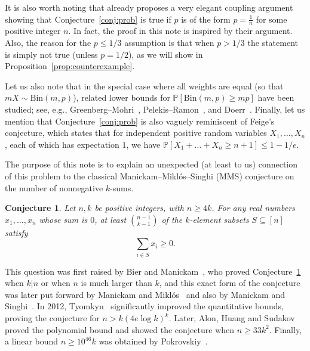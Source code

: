 \documentclass[11pt]{amsart}
\newtheorem{conjecture}[theorem]{\bf Conjecture}
\theoremstyle{definition}
\def\Pb{\mathbb{P}}
\begin{document}
It is also worth noting that \cite{AEFT13} already proposes a very elegant coupling argument showing that Conjecture~\ref{conj:prob} is true if $p$ is of the form $p=\frac{1}{n}$ for some positive integer $n$. In fact, the proof in this note is inspired by their argument. Also, the reason for the $p\leq 1/3$ assumption is that when $p>1/3$ the statement is simply not true (unless $p=1/2$), as we will show in Proposition~\ref{prop:counterexample}.

Let us also note that in the special case where all weights are equal (so that $mX\sim \mathrm{Bin}(m,p)$), related lower bounds for $\Pb[\mathrm{Bin}(m,p)\ge mp]$ have been studied; see, e.g., Greenberg--Mohri~\cite{GM14}, Pelekis--Ramon~\cite{PR16}, and Doerr~\cite{Doe18}. Finally, let us mention that Conjecture~\ref{conj:prob} is also vaguely reminiscent of Feige's conjecture, which states that for independent positive random variables $X_1, \dots, X_n$, each of which has expectation $1$, we have $\Pb[X_1+\dots+X_n\geq n+1]\leq 1-1/e$. 

The purpose of this note is to explain an unexpected (at least to us) connection of this problem to the classical Manickam--Mikl\'os--Singhi (MMS) conjecture on the number of nonnegative $k$-sums.

\begin{conjecture}\label{conj:MMS}
Let $n,k$ be positive integers, with $n\ge 4k$. For any real numbers $x_1,\dots,x_n$ whose sum is $0$, at least $\binom{n-1}{k-1}$ of the $k$-element subsets $S\subseteq [n]$ satisfy
\[
  \sum_{i\in S} x_i \ge 0.
\]
\end{conjecture}

This question was first raised by Bier and Manickam~\cite{BM87}, who proved Conjecture~\ref{conj:MMS} when $k|n$ or when $n$ is much larger than $k$, and this exact form of the conjecture was later put forward by Manickam and Mikl\'os~\cite{MM88} and also by Manickam and Singhi~\cite{MS88}. In 2012, Tyomkyn~\cite{Tyom12} significantly improved the quantitative bounds, proving the conjecture for $n>k(4e\log k)^k$. Later, Alon, Huang and Sudakov~\cite{AHS11} proved the polynomial bound and showed the conjecture when $n\ge 33k^2$. Finally, a linear bound $n\geq 10^{46} k$ was obtained by Pokrovskiy~\cite{Pok15}.
\end{document}

